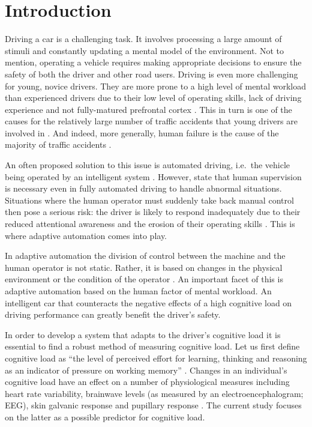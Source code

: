 
\section{Introduction}\label{sec:introduction}

Driving a car is a challenging task. 
It involves processing a large amount of stimuli and constantly updating a mental model of the environment.
Not to mention, operating a vehicle requires making appropriate decisions to ensure the safety of both the driver and other road users.
Driving is even more challenging for young, novice drivers. 
They are more prone to a high level of mental workload than experienced drivers due to their low level of operating skills, lack of driving experience \citep{Gregersen1996} and not fully-matured prefrontal cortex \citep{Ross2014}.
This in turn is one of the causes for the relatively large number of traffic accidents that young drivers are involved in \citep{Sena2013}.
And indeed, more generally, human failure is the cause of the majority of traffic accidents \citep{DeWaard1996}.

An often proposed solution to this issue is automated driving, i.e.\ the vehicle being operated by an intelligent system \citep{Cabrall2018}.
However, \citet{Brookhuis2007} state that human supervision is necessary even in fully automated driving to handle abnormal situations.
Situations where the human operator must suddenly take back manual control then pose a serious risk:
the driver is likely to respond inadequately due to their reduced attentional awareness and the erosion of their operating skills \citep{Dijksterhuis2012}.
This is where adaptive automation comes into play.

In adaptive automation the division of control between the machine and the human operator is not static.
Rather, it is based on changes in the physical environment or the condition of the operator \citep{Sheridan2011}.
An important facet of this is adaptive automation based on the human factor of mental workload.
An intelligent car that counteracts the negative effects of a high cognitive load on driving performance can greatly benefit the driver's safety.

In order to develop a system that adapts to the driver's cognitive load it is essential to find a robust method of measuring cognitive load.
Let us first define cognitive load as ``the level of perceived effort for learning, thinking and reasoning as an indicator of pressure on working memory'' \citep[p.~302]{Haapalainen2010}.
Changes in an individual's cognitive load have an effect on a number of physiological measures including heart rate variability, brainwave levels (as measured by an electroencephalogram; EEG), skin galvanic response and pupillary response \citep{Haapalainen2010}.
The current study focuses on the latter as a possible predictor for cognitive load.

